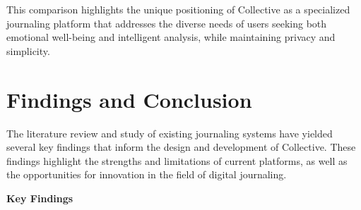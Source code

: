 This comparison highlights the unique positioning of Collective as a specialized journaling platform that addresses the diverse needs of users seeking both emotional well-being and intelligent analysis, while maintaining privacy and simplicity.

\section{Findings and Conclusion}\label{sec:findings}

The literature review and study of existing journaling systems have yielded several key findings that inform the design and development of Collective. These findings highlight the strengths and limitations of current platforms, as well as the opportunities for innovation in the field of digital journaling.

\textbf{Key Findings}

